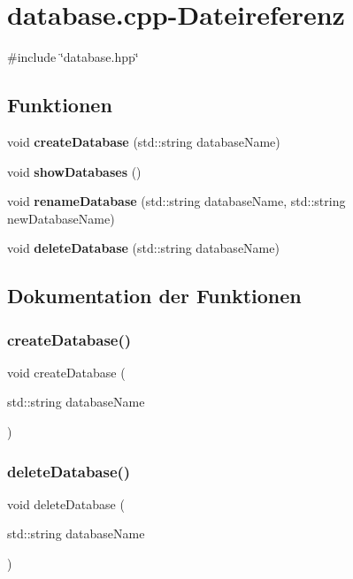 \section{database.\+cpp-\/\+Dateireferenz}
\label{database_8cpp}
{\ttfamily \#include \char`\"{}database.\+hpp\char`\"{}}\newline
\subsection*{Funktionen}
\begin{DoxyCompactItemize}
\item 
void \textbf{ create\+Database} (std\+::string database\+Name)
\item 
void \textbf{ show\+Databases} ()
\item 
void \textbf{ rename\+Database} (std\+::string database\+Name, std\+::string new\+Database\+Name)
\item 
void \textbf{ delete\+Database} (std\+::string database\+Name)
\end{DoxyCompactItemize}


\subsection{Dokumentation der Funktionen}
\mbox{\label{database_8cpp_abf48eb274e662a7de3f5f190d126b765}} 
\subsubsection{create\+Database()}
{\footnotesize\ttfamily void create\+Database (\begin{DoxyParamCaption}\item[{std\+::string}]{database\+Name }\end{DoxyParamCaption})}

\mbox{\label{database_8cpp_a1d1fac4a7c1506f81908532050a8e58f}} 
\subsubsection{delete\+Database()}
{\footnotesize\ttfamily void delete\+Database (\begin{DoxyParamCaption}\item[{std\+::string}]{database\+Name }\end{DoxyParamCaption})}

